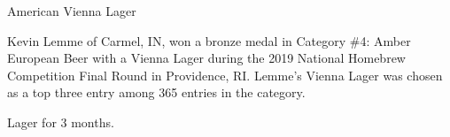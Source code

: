 \stylesection{\styleviennalager}

\begin{recipe}{American Vienna Lager}

\begin{aboutblock}
Kevin Lemme of Carmel, IN, won a bronze medal in Category \#4: Amber European Beer with
a Vienna Lager during the 2019 National Homebrew Competition Final Round in Providence,
RI. Lemme's Vienna Lager was chosen as a top three entry among 365 entries in the category. \sourceaha
\end{aboutblock}


\begin{methodandtiming}
 
\begin{mashsteps}
\end{mashsteps}

\begin{fermentationsteps}
\end{fermentationsteps}

\begin{directions}
Lager for 3 months.
\end{directions}

\end{methodandtiming}

\recipebreak

\begin{ingredientsblock}

\begin{malts}
\end{malts}

\begin{hops}
\end{hops}


\end{ingredientsblock}

\end{recipe}

